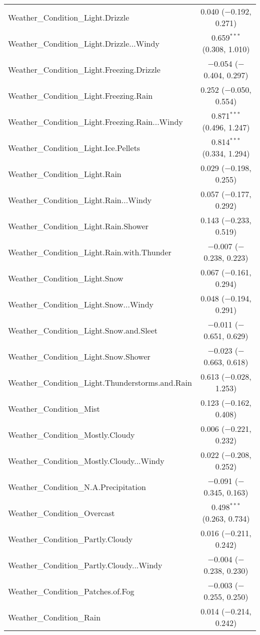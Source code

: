 \begin{table}[!htbp]
\begin{tabular}{@{\extracolsep{5pt}}lc}
  Weather\_Condition\_Light.Drizzle & 0.040 ($-$0.192, 0.271) \\ 
  Weather\_Condition\_Light.Drizzle...Windy & 0.659$^{***}$ (0.308, 1.010) \\ 
  Weather\_Condition\_Light.Freezing.Drizzle & $-$0.054 ($-$0.404, 0.297) \\ 
  Weather\_Condition\_Light.Freezing.Rain & 0.252 ($-$0.050, 0.554) \\ 
  Weather\_Condition\_Light.Freezing.Rain...Windy & 0.871$^{***}$ (0.496, 1.247) \\ 
  Weather\_Condition\_Light.Ice.Pellets & 0.814$^{***}$ (0.334, 1.294) \\ 
  Weather\_Condition\_Light.Rain & 0.029 ($-$0.198, 0.255) \\ 
  Weather\_Condition\_Light.Rain...Windy & 0.057 ($-$0.177, 0.292) \\ 
  Weather\_Condition\_Light.Rain.Shower & 0.143 ($-$0.233, 0.519) \\ 
  Weather\_Condition\_Light.Rain.with.Thunder & $-$0.007 ($-$0.238, 0.223) \\ 
  Weather\_Condition\_Light.Snow & 0.067 ($-$0.161, 0.294) \\ 
  Weather\_Condition\_Light.Snow...Windy & 0.048 ($-$0.194, 0.291) \\ 
  Weather\_Condition\_Light.Snow.and.Sleet & $-$0.011 ($-$0.651, 0.629) \\ 
  Weather\_Condition\_Light.Snow.Shower & $-$0.023 ($-$0.663, 0.618) \\ 
  Weather\_Condition\_Light.Thunderstorms.and.Rain & 0.613 ($-$0.028, 1.253) \\ 
  Weather\_Condition\_Mist & 0.123 ($-$0.162, 0.408) \\ 
  Weather\_Condition\_Mostly.Cloudy & 0.006 ($-$0.221, 0.232) \\ 
  Weather\_Condition\_Mostly.Cloudy...Windy & 0.022 ($-$0.208, 0.252) \\ 
  Weather\_Condition\_N.A.Precipitation & $-$0.091 ($-$0.345, 0.163) \\ 
  Weather\_Condition\_Overcast & 0.498$^{***}$ (0.263, 0.734) \\ 
  Weather\_Condition\_Partly.Cloudy & 0.016 ($-$0.211, 0.242) \\ 
  Weather\_Condition\_Partly.Cloudy...Windy & $-$0.004 ($-$0.238, 0.230) \\ 
  Weather\_Condition\_Patches.of.Fog & $-$0.003 ($-$0.255, 0.250) \\ 
  Weather\_Condition\_Rain & 0.014 ($-$0.214, 0.242) \\ 

\end{tabular}
\end{table}
